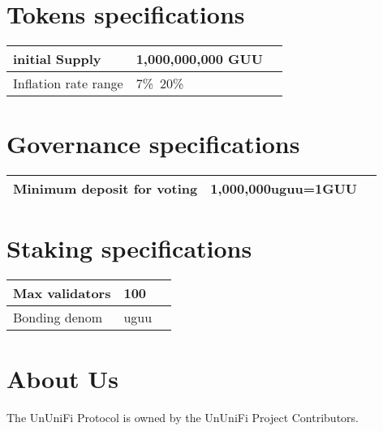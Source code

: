 \documentclass[dvipdfmx]{jsarticle}
\begin{document}
\section{Tokens specifications}

\begin{table}[htb]
  \begin{tabular}{|l|l|l|}  \hline
    initial Supply & 1,000,000,000 GUU \\ \hline
    Inflation rate range & 7\%~20\% \\ \hline
  \end{tabular}
\end{table}

\section{Governance specifications}

\begin{table}[htb]
  \begin{tabular}{|l|l|l|}  \hline
    Minimum deposit for voting & 1,000,000uguu=1GUU \\ \hline
  \end{tabular}
\end{table}

\section{Staking specifications}

\begin{table}[htb]
  \begin{tabular}{|l|l|l|}  \hline
    Max validators & 100 \\ \hline
    Bonding denom & uguu \\ \hline
  \end{tabular}
\end{table}


\section{About Us}
The UnUniFi Protocol is owned by the UnUniFi Project Contributors.
\end{document}

